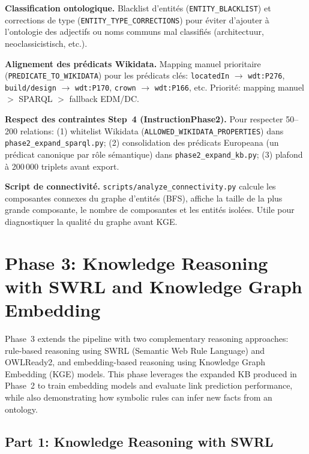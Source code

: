 \documentclass[11pt,a4paper]{article}
\begin{document}
  \textbf{Classification ontologique.} Blacklist d'entités (\texttt{ENTITY\_BLACKLIST}) et corrections de type (\texttt{ENTITY\_TYPE\_CORRECTIONS}) pour éviter d'ajouter à l'ontologie des adjectifs ou noms communs mal classifiés (architectuur, neoclassicistisch, etc.).

  \textbf{Alignement des prédicats Wikidata.} Mapping manuel prioritaire (\texttt{PREDICATE\_TO\_WIKIDATA}) pour les prédicats clés: \texttt{locatedIn} $\rightarrow$ \texttt{wdt:P276}, \texttt{build/design} $\rightarrow$ \texttt{wdt:P170}, \texttt{crown} $\rightarrow$ \texttt{wdt:P166}, etc. Priorité: mapping manuel $>$ SPARQL $>$ fallback EDM/DC.

  \textbf{Respect des contraintes Step~4 (InstructionPhase2).} Pour respecter 50--200 relations: (1) whitelist Wikidata (\texttt{ALLOWED\_WIKIDATA\_PROPERTIES}) dans \texttt{phase2\_expand\_sparql.py}; (2) consolidation des prédicats Europeana (un prédicat canonique par rôle sémantique) dans \texttt{phase2\_expand\_kb.py}; (3) plafond à 200\,000 triplets avant export.

  \textbf{Script de connectivité.} \texttt{scripts/analyze\_connectivity.py} calcule les composantes connexes du graphe d'entités (BFS), affiche la taille de la plus grande composante, le nombre de composantes et les entités isolées. Utile pour diagnostiquer la qualité du graphe avant KGE.

  \section{Phase 3: Knowledge Reasoning with SWRL and Knowledge Graph Embedding}

  Phase~3 extends the pipeline with two complementary reasoning approaches: rule-based reasoning using SWRL (Semantic Web Rule Language) and OWLReady2, and embedding-based reasoning using Knowledge Graph Embedding (KGE) models. This phase leverages the expanded KB produced in Phase~2 to train embedding models and evaluate link prediction performance, while also demonstrating how symbolic rules can infer new facts from an ontology.

  \subsection{Part 1: Knowledge Reasoning with SWRL}
\end{document}
